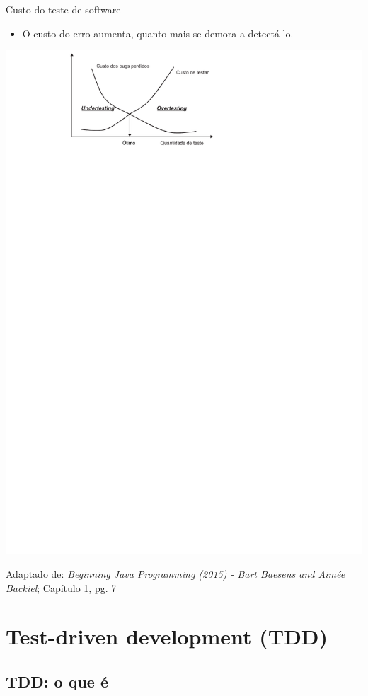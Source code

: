 \documentclass[handout]{beamer}
\begin{document}
\begin{frame}{Custo do teste de software}

\begin{itemize}
\item O custo do erro aumenta, quanto mais se demora a detectá-lo.
\end{itemize}

{\centering \includegraphics[width=.73\textwidth]{custoTeste.pdf}

{\tiny Adaptado de: \textit{Beginning Java Programming (2015) - Bart Baesens and Aimée Backiel}; Capítulo 1, pg. 7}}
\end{frame}



\section{Test-driven development (TDD)}

\subsection{TDD: o que é} 
\end{document}
